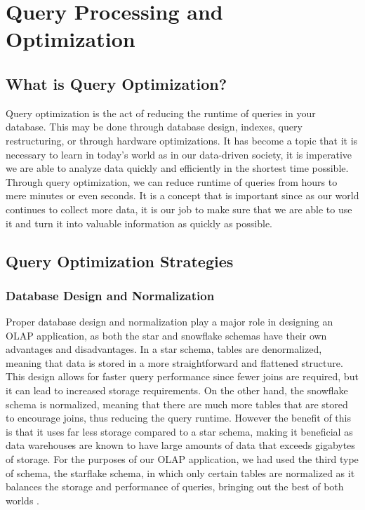 \section{Query Processing and Optimization}

\subsection{What is Query Optimization?}

Query optimization is the act of reducing the runtime of queries in your database. This may be done through database design, indexes, query restructuring, or through hardware optimizations. It has become a topic that it is necessary to learn in today's world as in our data-driven society, it is imperative we are able to analyze data quickly and efficiently in the shortest time possible. Through query optimization, we can reduce runtime of queries from hours to mere minutes or even seconds. It is a concept that is important since as our world continues to collect more data, it is our job to make sure that we are able to use it and turn it into valuable information as quickly as possible.

\subsection{Query Optimization Strategies}

\subsubsection{Database Design and Normalization}

Proper database design and normalization play a major role in designing an OLAP application, as both the star and snowflake schemas have their own advantages and disadvantages. In a star schema, tables are denormalized, meaning that data is stored in a more straightforward and flattened structure. This design allows for faster query performance since fewer joins are required, but it can lead to increased storage requirements. On the other hand, the snowflake schema is normalized, meaning that there are much more tables that are stored to encourage joins, thus reducing the query runtime. However the benefit of this is that it uses far less storage compared to a star schema, making it beneficial as data warehouses are known to have large amounts of data that exceeds gigabytes of storage. For the purposes of our OLAP application, we had used the third type of schema, the starflake schema, in which only certain tables are normalized as it balances the storage and performance of queries, bringing out the best of both worlds \cite{ibm2021datawarehouse,kimball2013datawarehouse}. \\

